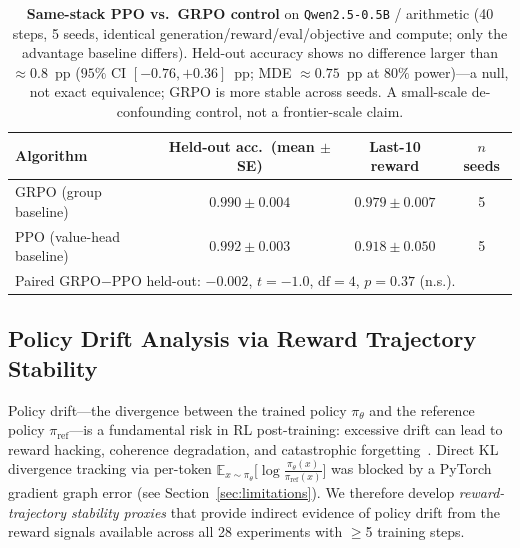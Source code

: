 \documentclass{article}
\begin{document}
\begin{table}[ht]
\centering
\small
\begin{tabular}{lccc}
\toprule
\textbf{Algorithm} & \textbf{Held-out acc.\ (mean $\pm$ SE)} & \textbf{Last-10 reward} & \textbf{$n$ seeds} \\
\midrule
GRPO (group baseline)      & $0.990 \pm 0.004$ & $0.979 \pm 0.007$ & 5 \\
PPO (value-head baseline)  & $0.992 \pm 0.003$ & $0.918 \pm 0.050$ & 5 \\
\midrule
\multicolumn{4}{l}{\small Paired GRPO$-$PPO held-out: $-0.002$, $t{=}{-}1.0$, $\mathrm{df}{=}4$, $p{=}0.37$ (n.s.).} \\
\bottomrule
\end{tabular}
\caption{\textbf{Same-stack PPO vs.\ GRPO control} on \texttt{Qwen2.5-0.5B} /
arithmetic (40 steps, 5 seeds, identical generation/reward/eval/objective and
compute; only the advantage baseline differs). Held-out accuracy shows no
difference larger than $\approx 0.8$~pp ($95\%$ CI $[-0.76,+0.36]$~pp; MDE
$\approx 0.75$~pp at $80\%$ power)---a null, not exact equivalence; GRPO is more
stable across seeds. A small-scale de-confounding control, not a frontier-scale
claim.}
\label{tab:samestack}
\end{table}

\subsection{Policy Drift Analysis via Reward Trajectory Stability}
\label{sec:kl}

Policy drift---the divergence between the trained policy $\pi_\theta$ and
the reference policy $\pi_{\mathrm{ref}}$---is a fundamental risk in RL
post-training: excessive drift can lead to reward hacking, coherence
degradation, and catastrophic forgetting~\citep{schulman2017proximal}.
Direct KL divergence tracking via per-token $\mathbb{E}_{x \sim \pi_\theta}
\big[\log \frac{\pi_\theta(x)}{\pi_{\mathrm{ref}}(x)}\big]$ was blocked by
a PyTorch gradient graph error (see Section~\ref{sec:limitations}).
We therefore develop \emph{reward-trajectory stability proxies} that
provide indirect evidence of policy drift from the reward signals
available across all 28 experiments with $\geq$5 training steps.
\end{document}
